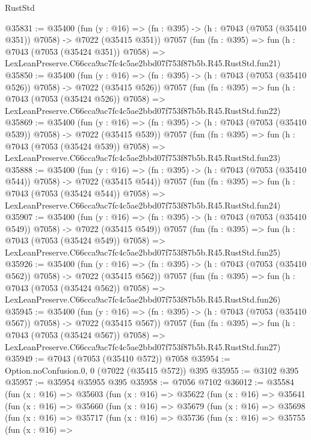 \begin{lexlean}{RustStd}
\begin{coremodule}
@35831 := @35400
    (fun (y : @16) => (fn : @395) -> (h : @7043 (@7053 (@35410 @351)) @7058) -> @7022 (@35415 @351))
    @7057
    (fun (fn : @395) =>
    fun (h : @7043 (@7053 (@35424 @351)) @7058) =>
    LexLeanPreserve.C66cca9ac7fc4c5ae2bbd07f753f87b5b.R45.RustStd.fun21)
@35850 := @35400
    (fun (y : @16) => (fn : @395) -> (h : @7043 (@7053 (@35410 @526)) @7058) -> @7022 (@35415 @526))
    @7057
    (fun (fn : @395) =>
    fun (h : @7043 (@7053 (@35424 @526)) @7058) =>
    LexLeanPreserve.C66cca9ac7fc4c5ae2bbd07f753f87b5b.R45.RustStd.fun22)
@35869 := @35400
    (fun (y : @16) => (fn : @395) -> (h : @7043 (@7053 (@35410 @539)) @7058) -> @7022 (@35415 @539))
    @7057
    (fun (fn : @395) =>
    fun (h : @7043 (@7053 (@35424 @539)) @7058) =>
    LexLeanPreserve.C66cca9ac7fc4c5ae2bbd07f753f87b5b.R45.RustStd.fun23)
@35888 := @35400
    (fun (y : @16) => (fn : @395) -> (h : @7043 (@7053 (@35410 @544)) @7058) -> @7022 (@35415 @544))
    @7057
    (fun (fn : @395) =>
    fun (h : @7043 (@7053 (@35424 @544)) @7058) =>
    LexLeanPreserve.C66cca9ac7fc4c5ae2bbd07f753f87b5b.R45.RustStd.fun24)
@35907 := @35400
    (fun (y : @16) => (fn : @395) -> (h : @7043 (@7053 (@35410 @549)) @7058) -> @7022 (@35415 @549))
    @7057
    (fun (fn : @395) =>
    fun (h : @7043 (@7053 (@35424 @549)) @7058) =>
    LexLeanPreserve.C66cca9ac7fc4c5ae2bbd07f753f87b5b.R45.RustStd.fun25)
@35926 := @35400
    (fun (y : @16) => (fn : @395) -> (h : @7043 (@7053 (@35410 @562)) @7058) -> @7022 (@35415 @562))
    @7057
    (fun (fn : @395) =>
    fun (h : @7043 (@7053 (@35424 @562)) @7058) =>
    LexLeanPreserve.C66cca9ac7fc4c5ae2bbd07f753f87b5b.R45.RustStd.fun26)
@35945 := @35400
    (fun (y : @16) => (fn : @395) -> (h : @7043 (@7053 (@35410 @567)) @7058) -> @7022 (@35415 @567))
    @7057
    (fun (fn : @395) =>
    fun (h : @7043 (@7053 (@35424 @567)) @7058) =>
    LexLeanPreserve.C66cca9ac7fc4c5ae2bbd07f753f87b5b.R45.RustStd.fun27)
@35949 := @7043 (@7053 (@35410 @572)) @7058
@35954 := Option.noConfusion.{0, 0} (@7022 (@35415 @572)) @395
@35955 := @3102 @395
@35957 := @35954 @35955 @395
@35958 := @7056 @7102
@36012 := @35584
    (fun (x : @16) =>
    @35603
      (fun (x : @16) =>
      @35622
        (fun (x : @16) =>
        @35641
          (fun (x : @16) =>
          @35660
            (fun (x : @16) =>
            @35679
              (fun (x : @16) =>
              @35698
                (fun (x : @16) =>
                @35717
                  (fun (x : @16) =>
                  @35736
                    (fun (x : @16) =>
                    @35755
                      (fun (x : @16) =>

\end{coremodule}
\end{lexlean}
